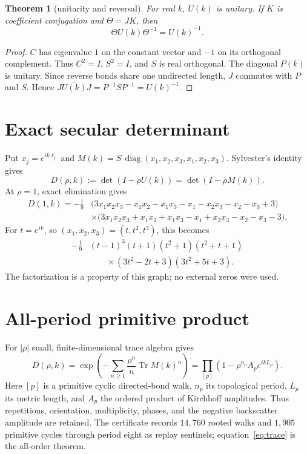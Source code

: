 \documentclass[11pt]{article}
\newtheorem{theorem}{Theorem}
\newcommand{\Tr}{\operatorname{Tr}}
\begin{document}
\begin{theorem}[unitarity and reversal]\label{thm:unitary}
For real $k$, $U(k)$ is unitary.  If $K$ is coefficient conjugation and
$\Theta=JK$, then
\[
 \Theta U(k)\Theta^{-1}=U(k)^{-1}.
\]
\end{theorem}
\begin{proof}
$C$ has eigenvalue $1$ on the constant vector and $-1$ on its orthogonal
complement.  Thus $C^2=I$, $S^2=I$, and $S$ is real orthogonal.  The diagonal
$P(k)$ is unitary.  Since reverse bonds share one undirected length, $J$
commutes with $P$ and $S$.  Hence
$J\overline{U(k)}J=P^{-1}SP^{-1}=U(k)^{-1}$.
\end{proof}

\section{Exact secular determinant}

Put $x_j=e^{ik\ell_j}$ and
$M(k)=S\,\operatorname{diag}(x_1,x_2,x_3,x_1,x_2,x_3)$.  Sylvester's identity
gives
\[
 D(\rho,k):=\det(I-\rho U(k))=\det(I-\rho M(k)).
\]
At $\rho=1$, exact elimination gives
\begin{align*}
 D(1,k)=-\frac19&\bigl(3x_1x_2x_3-x_1x_2-x_1x_3-x_1-x_2x_3-x_2-x_3+3\bigr)\\
 &\times\bigl(3x_1x_2x_3+x_1x_2+x_1x_3-x_1+x_2x_3-x_2-x_3-3\bigr).
\end{align*}
For $t=e^{ik}$, so $(x_1,x_2,x_3)=(t,t^2,t^3)$, this becomes
\begin{align}\label{eq:factor}
 -\frac19&(t-1)^3(t+1)(t^2+1)(t^2+t+1)\nonumber\\
 &\qquad\times(3t^2-2t+3)(3t^2+5t+3).
\end{align}
The factorization is a property of this graph; no external zeros were used.

\section{All-period primitive product}

For $|\rho|$ small, finite-dimensional trace algebra gives
\begin{equation}\label{eq:trace}
 D(\rho,k)=\exp\!\left(-\sum_{n\ge1}\frac{\rho^n}{n}\Tr M(k)^n\right)
 =\prod_{[p]}\left(1-\rho^{n_p}A_p e^{ikL_p}\right).
\end{equation}
Here $[p]$ is a primitive cyclic directed-bond walk, $n_p$ its topological
period, $L_p$ its metric length, and $A_p$ the ordered product of Kirchhoff
amplitudes.  Thus repetitions, orientation, multiplicity, phases, and the
negative backscatter amplitude are retained.  The certificate records
$14{,}760$ rooted walks and $1{,}905$ primitive cycles through period eight as
replay sentinels; equation~\eqref{eq:trace} is the all-order theorem.
\end{document}
